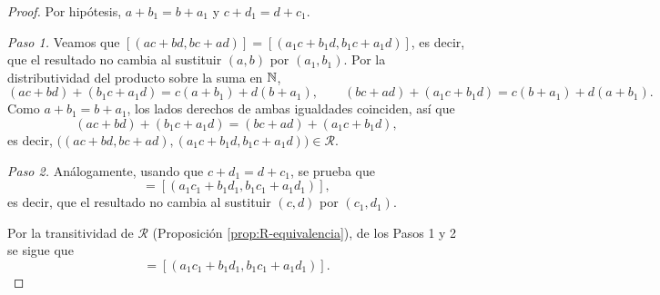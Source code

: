 \documentclass[12pt,a4paper]{book}
\begin{document}
    \begin{proof}
        Por hipótesis, $a+b_{1}=b+a_{1}$ y $c+d_{1}=d+c_{1}$.

        \emph{Paso 1.} Veamos que $[(ac+bd,bc+ad)]=[(a_{1}c+b_{1}d,b_{1}c+a_{1}d)]$, es decir, que el resultado no cambia al sustituir $(a,b)$ por $(a_{1},b_{1})$. Por la distributividad del producto sobre la suma en $\mathbb{N}$,
        \begin{equation*}
            (ac+bd)+(b_{1}c+a_{1}d) = c(a+b_{1})+d(b+a_{1}), \qquad (bc+ad)+(a_{1}c+b_{1}d) = c(b+a_{1})+d(a+b_{1}).
        \end{equation*}
        Como $a+b_{1}=b+a_{1}$, los lados derechos de ambas igualdades coinciden, así que
        \begin{equation*}
            (ac+bd)+(b_{1}c+a_{1}d) = (bc+ad)+(a_{1}c+b_{1}d),
        \end{equation*}
        es decir, $\big((ac+bd,bc+ad),(a_{1}c+b_{1}d,b_{1}c+a_{1}d)\big)\in\mathcal{R}$.

        \emph{Paso 2.} Análogamente, usando que $c+d_{1}=d+c_{1}$, se prueba que
        \begin{equation*}
            [(a_{1}c+b_{1}d,b_{1}c+a_{1}d)] = [(a_{1}c_{1}+b_{1}d_{1},b_{1}c_{1}+a_{1}d_{1})],
        \end{equation*}
        es decir, que el resultado no cambia al sustituir $(c,d)$ por $(c_{1},d_{1})$.

        Por la transitividad de $\mathcal{R}$ (Proposición \ref{prop:R-equivalencia}), de los Pasos 1 y 2 se sigue que
        \begin{equation*}
            [(ac+bd,bc+ad)] = [(a_{1}c_{1}+b_{1}d_{1},b_{1}c_{1}+a_{1}d_{1})].
        \end{equation*}
    \end{proof}
\end{document}
